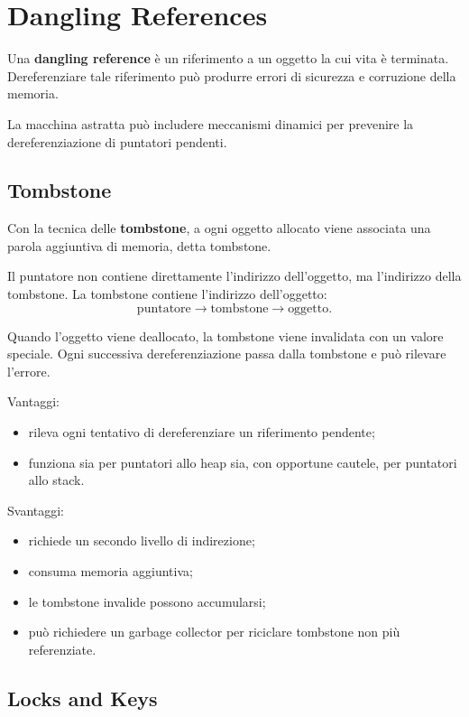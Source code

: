\documentclass{article}
\begin{document}
\section{Dangling References}

Una \textbf{dangling reference} è un riferimento a un oggetto la cui vita è terminata. Dereferenziare tale riferimento può produrre errori di sicurezza e corruzione della memoria.

La macchina astratta può includere meccanismi dinamici per prevenire la dereferenziazione di puntatori pendenti.

\subsection{Tombstone}

Con la tecnica delle \textbf{tombstone}, a ogni oggetto allocato viene associata una parola aggiuntiva di memoria, detta tombstone.

Il puntatore non contiene direttamente l'indirizzo dell'oggetto, ma l'indirizzo della tombstone. La tombstone contiene l'indirizzo dell'oggetto:
\[
\text{puntatore} \to \text{tombstone} \to \text{oggetto}.
\]

Quando l'oggetto viene deallocato, la tombstone viene invalidata con un valore speciale. Ogni successiva dereferenziazione passa dalla tombstone e può rilevare l'errore.

Vantaggi:
\begin{itemize}
  \item rileva ogni tentativo di dereferenziare un riferimento pendente;
  \item funziona sia per puntatori allo heap sia, con opportune cautele, per puntatori allo stack.
\end{itemize}

Svantaggi:
\begin{itemize}
  \item richiede un secondo livello di indirezione;
  \item consuma memoria aggiuntiva;
  \item le tombstone invalide possono accumularsi;
  \item può richiedere un garbage collector per riciclare tombstone non più referenziate.
\end{itemize}

\subsection{Locks and Keys}
\end{document}
